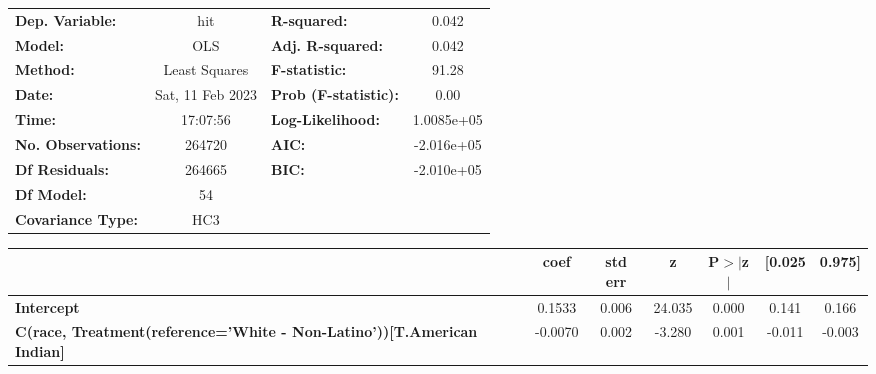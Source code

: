 \begin{center}
\begin{tabular}{lclc}
\toprule
\textbf{Dep. Variable:}                                                           &       hit        & \textbf{  R-squared:         } &      0.042   \\
\textbf{Model:}                                                                   &       OLS        & \textbf{  Adj. R-squared:    } &      0.042   \\
\textbf{Method:}                                                                  &  Least Squares   & \textbf{  F-statistic:       } &      91.28   \\
\textbf{Date:}                                                                    & Sat, 11 Feb 2023 & \textbf{  Prob (F-statistic):} &      0.00    \\
\textbf{Time:}                                                                    &     17:07:56     & \textbf{  Log-Likelihood:    } &  1.0085e+05  \\
\textbf{No. Observations:}                                                        &      264720      & \textbf{  AIC:               } &  -2.016e+05  \\
\textbf{Df Residuals:}                                                            &      264665      & \textbf{  BIC:               } &  -2.010e+05  \\
\textbf{Df Model:}                                                                &          54      & \textbf{                     } &              \\
\textbf{Covariance Type:}                                                         &       HC3        & \textbf{                     } &              \\
\bottomrule
\end{tabular}
\begin{tabular}{lcccccc}
                                                                                  & \textbf{coef} & \textbf{std err} & \textbf{z} & \textbf{P$> |$z$|$} & \textbf{[0.025} & \textbf{0.975]}  \\
\midrule
\textbf{Intercept}                                                                &       0.1533  &        0.006     &    24.035  &         0.000        &        0.141    &        0.166     \\
\textbf{C(race, Treatment(reference='White - Non-Latino'))[T.American Indian]}    &      -0.0070  &        0.002     &    -3.280  &         0.001        &       -0.011    &       -0.003     \\

\end{tabular}
\end{center}

